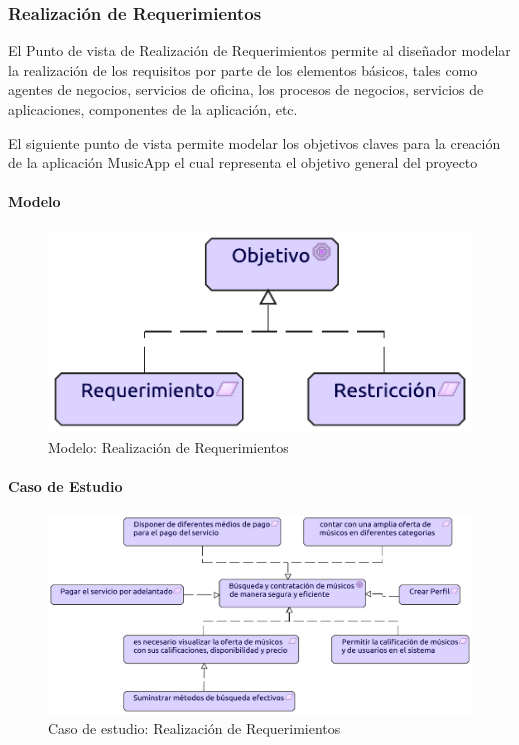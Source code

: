 \newpage

\subsubsection{Realización de Requerimientos}
El Punto de vista de Realización de Requerimientos permite al diseñador modelar la realización de los requisitos por parte de los elementos básicos, tales como agentes de negocios, servicios de oficina, los procesos de negocios, servicios de aplicaciones, componentes de la aplicación, etc.  \vspace{\baselineskip}

El siguiente punto de vista permite modelar los objetivos claves para la creación de la aplicación MusicApp el cual representa el objetivo general del proyecto

\paragraph{Modelo}
\begin{figure}[h!]
	\centering
	\includegraphics[width=0.8\linewidth]{Desarrollo/ArquitecturaEmpresarial/Motivacion/imgs/RealizacionMetamodelo.pdf}
	\caption{Modelo: Realización de Requerimientos}
\end{figure}
\newpage
\paragraph{Caso de Estudio}
\begin{figure}[h!]
	\centering
	\includegraphics[width=\linewidth]{Desarrollo/ArquitecturaEmpresarial/Motivacion/imgs/Realizacion.pdf}
	\caption{Caso de estudio: Realización de Requerimientos}
	\label{fig:comportamiento}
\end{figure}

